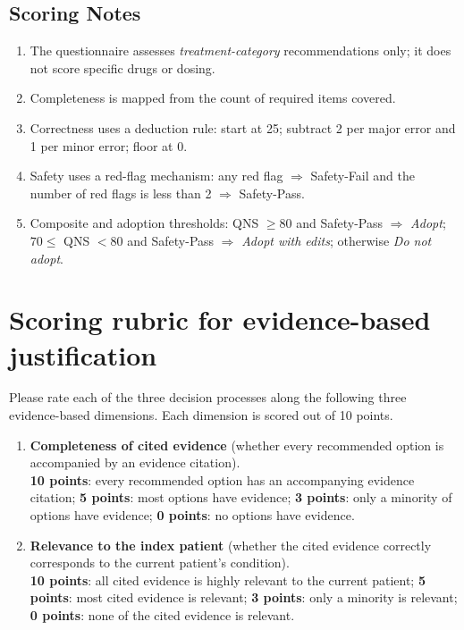 \documentclass{article}
\begin{document}
\begin{appendices}
\subsection*{Scoring Notes}
\begin{enumerate}\setlength\itemsep{4pt}
  \item The questionnaire assesses \emph{treatment-category} recommendations only; it does not score specific drugs or dosing.
  \item Completeness is mapped from the count of required items covered.
  \item Correctness uses a deduction rule: start at 25; subtract 2 per major error and 1 per minor error; floor at 0.
  \item Safety uses a red-flag mechanism: any red flag $\Rightarrow$ Safety-Fail and the number of red flags is less than 2 $\Rightarrow$ Safety-Pass.
  \item Composite and adoption thresholds: QNS $\ge 80$ and Safety-Pass $\Rightarrow$ \emph{Adopt}; $70 \le$ QNS $< 80$ and Safety-Pass $\Rightarrow$ \emph{Adopt with edits}; otherwise \emph{Do not adopt}.
\end{enumerate}


\section{Scoring rubric for evidence-based justification}
\label{sec:score_evidence}
\noindent Please rate each of the three decision processes along the following three evidence-based dimensions. Each dimension is scored out of 10 points.
\begin{enumerate}
  \item \textbf{Completeness of cited evidence} (whether every recommended option is accompanied by an evidence citation).\\
  \textbf{10 points}: every recommended option has an accompanying evidence citation; \textbf{5 points}: most options have evidence; \textbf{3 points}: only a minority of options have evidence; \textbf{0 points}: no options have evidence.

  \item \textbf{Relevance to the index patient} (whether the cited evidence correctly corresponds to the current patient’s condition).\\
  \textbf{10 points}: all cited evidence is highly relevant to the current patient; \textbf{5 points}: most cited evidence is relevant; \textbf{3 points}: only a minority is relevant; \textbf{0 points}: none of the cited evidence is relevant.


\end{enumerate}
\end{appendices}
\end{document}
